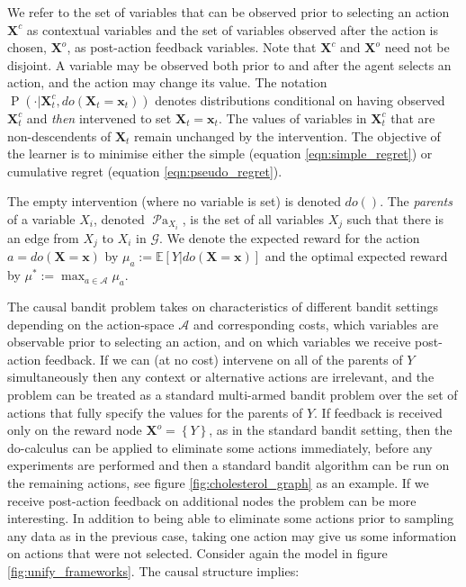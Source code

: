 \documentclass[11pt,a4paper,twoside]{report}
\newcommand{\actions}{\mathcal{A}}
\newcommand{\actionspace}{\mathcal{A}}
\newcommand{\E}[1]{\mathbb E\left[{#1}\right]}
\newcommand{\set}[1]{\left\{#1\right\}}
\renewcommand{\P}[1]{\operatorname{P}\left(#1\right)}
\newcommand{\parents}[1]{\operatorname{\mathcal{P}a}_{#1}}
\renewcommand{\vec}[1]{\boldsymbol{#1}}
\theoremstyle{plain}
\theoremstyle{definition}
\begin{document}
We refer to the set of variables that can be observed prior to selecting an action $\vec{X}^c$ as contextual variables and the set of variables observed after the action is chosen, $\vec{X}^o$, as post-action feedback variables. Note that $\vec{X}^c$ and $\vec{X}^o$ need not be disjoint. A variable may be observed both prior to and after the agent selects an action, and the action may change its value. The notation $\P{\cdot|\vec{X}^c_t, do(\vec{X}_t = \vec{x}_t)}$ denotes distributions conditional on having observed $\vec{X}^c_t$ and \emph{then} intervened to set $\vec{X}_t = \vec{x}_t$. The values of variables in $\vec{X}^c_t$ that are non-descendents of $\vec{X}_t$ remain unchanged by the intervention. The objective of the learner is to minimise either the simple (equation \ref{eqn:simple_regret}) or cumulative regret (equation \ref{eqn:pseudo_regret}). 

The empty intervention (where no variable is set) is denoted $do()$. The \emph{parents} of a variable $X_i$, denoted $\parents{X_i}$, is the set of all variables $X_j$ such that there is an edge from $X_j$ to $X_i$ in $\mathcal{G}$. We denote the expected reward for the action $a = do(\vec{X} = \vec{x})$ by $\mu_{a} := \E{Y | do(\vec{X} = \vec{x})}$ and the optimal expected reward by $\mu^* := \max_{a\in\actions} \mu_{a}$. 

The causal bandit problem takes on characteristics of different bandit settings depending on the action-space $\actionspace$ and corresponding costs, which variables are observable prior to selecting an action, and on which variables we receive post-action feedback. If we can (at no cost) intervene on all of the parents of $Y$ simultaneously then any context or alternative actions are irrelevant, and the problem can be treated as a standard multi-armed bandit problem over the set of actions that fully specify the values for the parents of $Y$. If feedback is received only on the reward node $\vec{X}^o = \set{Y}$, as in the standard bandit setting, then the do-calculus can be applied to eliminate some actions immediately, before any experiments are performed and then a standard bandit algorithm can be run on the remaining actions, see figure \ref{fig:cholesterol_graph} as an example. If we receive post-action feedback on additional nodes the problem can be more interesting. In addition to being able to eliminate some actions prior to sampling any data as in the previous case, taking one action may give us some information on actions that were not selected. Consider again the model in figure \ref{fig:unify_frameworks}. The causal structure implies: 
\end{document}
